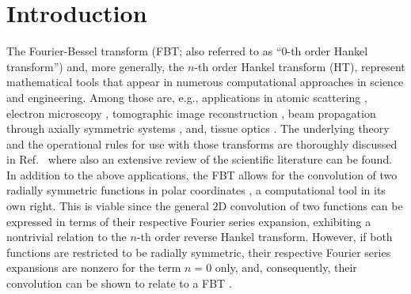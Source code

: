 \documentclass[12pt]{iopart}
\begin{document}
\maketitle

\section{Introduction}

The Fourier-Bessel transform (FBT; also referred to as ``$0$-th order Hankel
transform'') and, more generally, the $n$-th order Hankel transform (HT),
represent mathematical tools that appear in numerous computational approaches
in science and engineering.  Among those are, e.g., applications in atomic
scattering \cite{Talman:1978}, electron microscopy \cite{FiskJohnson:1987},
tomographic image reconstruction \cite{Higgins:1988}, beam propagation
through axially symmetric systems \cite{GuizarSicairos:2004}, and, tissue
optics \cite{CONV:1997}.  
The underlying theory and the operational rules for use with those transforms
are thoroughly discussed in Ref.~\cite{Baddour:2015} where also an extensive
review of the scientific literature can be found.
In addition to the above applications, the FBT allows for the convolution of
two radially symmetric functions in polar coordinates \cite{Baddour:2009}, a
computational tool in its own right.  This is viable since the general $2$D
convolution of two functions can be expressed in terms of their respective
Fourier series expansion, exhibiting a nontrivial relation to the $n$-th order
reverse Hankel transform. 
However, if both functions are restricted to be radially symmetric, their
respective Fourier series expansions are nonzero for the term $n=0$ only, and,
consequently, their convolution can be shown to relate to a FBT 
\cite{Baddour:2009}.  
\end{document}
